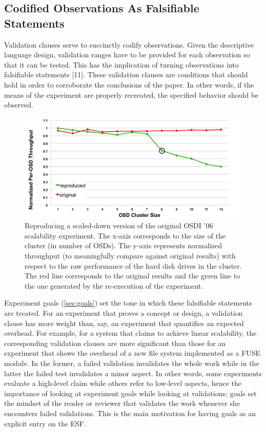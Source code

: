 \documentclass[10pt,reprint]{sigplanconf}
\renewcommand*{\hyperref}[2][\ar]{\def\ar{#2}#2\autoref{#1}}
\begin{document}
\subsection{Codified Observations As Falsifiable
Statements}\label{codified-observations-as-falsifiable-statements}

Validation clauses serve to succinctly codify observations. Given the
descriptive language design, validation ranges have to be provided for
each observation so that it can be tested. This has the implication of
turning observations into falsifiable statements {[}11{]}. These
validation clauses are conditions that should hold in order to
corroborate the conclusions of the paper. In other words, if the means
of the experiment are properly recreated, the specified behavior should
be observed.

\begin{figure}[htbp]
\centering
\includegraphics{figures/ceph.png}
\caption{Reproducing a scaled-down version of the original OSDI '06
scalability experiment. The x-axis corresponds to the size of the
cluster (in number of OSDs). The y-axis represents normalized throughput
(to meaningfully compare against original results) with respect to the
raw performance of the hard disk drives in the cluster. The red line
corresponds to the original results and the green line to the one
generated by the re-execution of the experiment.}
\end{figure}

Experiment goals (\hyperref[sec:goals]{}) set the tone in which these
falsifiable statements are treated. For an experiment that proves a
concept or design, a validation clause has more weight than, say, an
experiment that quantifies an expected overhead. For example, for a
system that claims to achieve linear scalability, the corresponding
validation clauses are more significant than those for an experiment
that shows the overhead of a new file system implemented as a FUSE
module. In the former, a failed validation invalidates the whole work
while in the latter the failed test invalidates a minor aspect. In other
words, some experiments evaluate a high-level claim while others refer
to low-level aspects, hence the importance of looking at experiment
goals while looking at validations; goals set the mindset of the reader
or reviewer that validates the work whenever she encounters failed
validations. This is the main motivation for having goals as an explicit
entry on the ESF.
\end{document}
